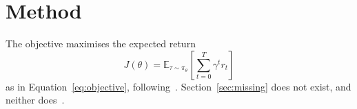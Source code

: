 \section{Method}\label{sec:method}
The objective maximises the expected return
\begin{equation}\label{eq:objective}
  J(\theta) = \mathbb{E}_{\tau \sim \pi_\theta}\left[\sum_{t=0}^{T} \gamma^t r_t\right]
\end{equation}
as in Equation~\ref{eq:objective}, following~\cite{schulman2017ppo}.
Section~\ref{sec:missing} does not exist, and neither does~\cite{nobody2020}.
